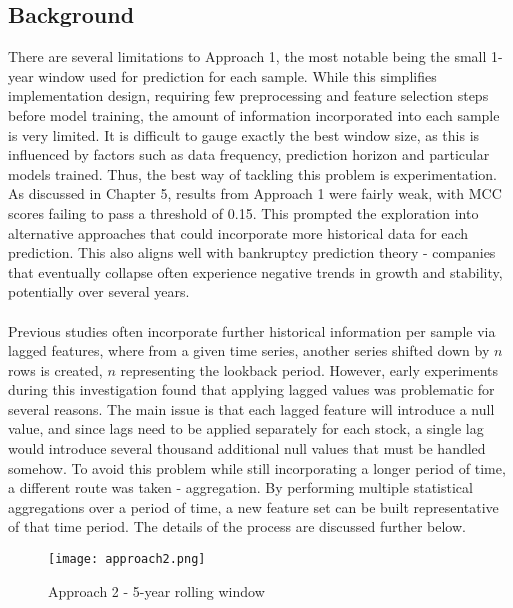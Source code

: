 \documentclass[a4paper]{report}
\begin{document}
\subsection{Background}
There are several limitations to Approach 1, the most notable being the small 1-year window used for prediction for each sample. While this simplifies implementation design, 
requiring few preprocessing and feature selection steps before model training, the amount of information incorporated into each sample is very limited. It is difficult to gauge 
exactly the best window size, as this is influenced by factors such as data frequency, prediction horizon and particular models trained. Thus, the best way of tackling this problem 
is experimentation. As discussed in Chapter 5, results from Approach 1 were fairly weak, with MCC scores failing to pass a threshold of 0.15. This prompted the exploration 
into alternative approaches that could incorporate more historical data for each prediction. This also aligns well with bankruptcy 
prediction theory - companies that eventually collapse often experience negative trends in growth and stability, potentially over several years.\\\\Previous studies 
often incorporate further historical information per sample via lagged features, where from a given time series, another series shifted down by \(n\) rows is created, \(n\)
representing the lookback period. However, early experiments during this investigation found that applying lagged values was problematic for several reasons. The main issue is 
that each lagged feature will introduce a null value, and since lags need to be applied separately for each stock, a single lag would introduce several thousand additional null values
that must be handled somehow. To avoid this problem while still incorporating a longer period of time, a different route was taken - aggregation. By performing multiple statistical 
aggregations over a period of time, a new feature set can be built representative of that time period. The details of the process are discussed further below.

\begin{figure}[h] %
  \centering
  \texttt{[image: approach2.png]} %
  \caption{Approach 2 - 5-year rolling window}
  \label{fig:approach2}
\end{figure}
\end{document}
